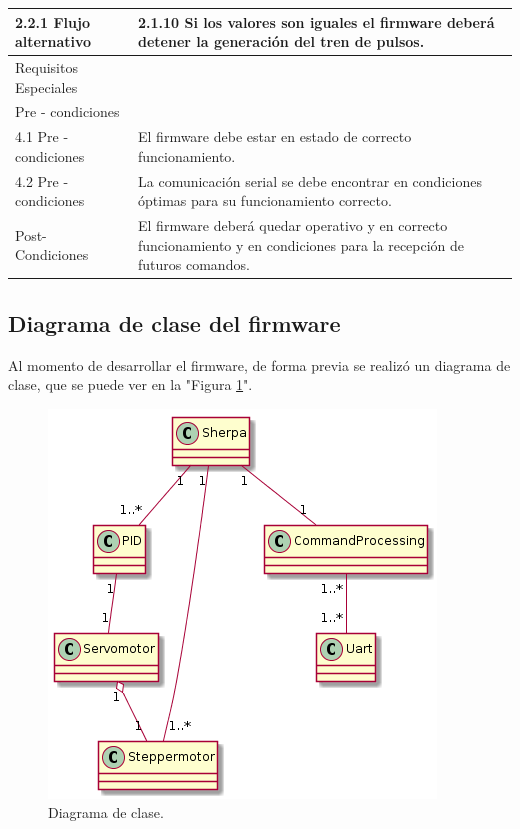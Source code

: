\begin{table}[htpb]
\begin{center}
\begin{tabular}{ | m{4cm} | m{9cm} | }
2.2.1 Flujo alternativo & 
2.1.10 Si los valores son iguales el firmware deberá detener la generación del tren de pulsos. \\ \hline
Requisitos Especiales & \\ \hline


Pre - condiciones & \\ \hline
 
4.1 Pre - condiciones &
El firmware debe estar en estado de correcto funcionamiento. \\ \hline
4.2 Pre - condiciones &
La comunicación serial se debe encontrar en condiciones óptimas para su funcionamiento correcto. \\ \hline
Post- Condiciones &
El firmware deberá quedar operativo y en correcto funcionamiento y en condiciones para la recepción de futuros comandos.\\ \hline
\end{tabular}

\label{tab:establecer un determinado valor de caudal.}
\end{center}
\end{table}

\vspace{2cm}


\subsection{Diagrama de clase del firmware}
\label{subsec:Diagrama de clase}
Al momento de desarrollar el firmware, de forma previa se realizó un diagrama de clase, que se puede ver en la "Figura \ref{fig:Diagrama de clase.}". 
\begin{figure}[htpb]
	\centering
	\includegraphics[scale=.75]{./Figures/DiagramaDeClase-DistribucionDeAgua.png}
	\caption{Diagrama de clase.}
	\label{fig:Diagrama de clase.}
	\end{figure}

